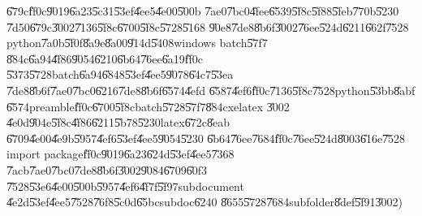 \begin{enumerate}
\U{679c}\U{ff0c}\U{9019}\U{6a23}\U{5c31}\U{53ef}\U{4ee5}\U{4e00}\U{500b}%
\U{7ae0}\U{7bc0}\U{4fee}\U{6539}\U{5f8c}\U{5f88}\U{5feb}\U{770b}\U{5230}%
\U{7d50}\U{679c}\U{3002}\U{7136}\U{5f8c}\U{6700}\U{5f8c}\U{5728}\U{5168}%
\U{90e8}\U{7de8}\U{8b6f}\U{3002}\U{76ee}\U{524d}\U{6211}\U{662f}\U{7528}%
python\U{7a0b}\U{5f0f}\U{8a9e}\U{8a00}\U{914d}\U{5408}windows batch\U{57f7}%
\U{884c}\U{6a94}\U{4f86}\U{9054}\U{6210}\U{6b64}\U{76ee}\U{6a19}\U{ff0c}%
\U{5373}\U{5728}batch\U{6a94}\U{6848}\U{53ef}\U{4ee5}\U{9078}\U{64c7}\U{53ea}%
\U{7de8}\U{8b6f}\U{7ae0}\U{7bc0}\U{6216}\U{7de8}\U{8b6f}\U{6574}\U{4efd}%
\U{6587}\U{4ef6}\U{ff0c}\U{7136}\U{5f8c}\U{7528}python\U{53bb}\U{8abf}%
\U{6574}preamble\U{ff0c}\U{6700}\U{5f8c}batch\U{5728}\U{57f7}\U{884c}xelatex%
\U{3002}\newline
\newline
\U{4e0d}\U{904e}\U{5f8c}\U{4f86}\U{6211}\U{5b78}\U{5230}latex\U{672c}\U{8eab}%
\U{6709}\U{4e00}\U{4e9b}\U{5957}\U{4ef6}\U{53ef}\U{4ee5}\U{9054}\U{5230}%
\U{6b64}\U{76ee}\U{7684}\U{ff0c}\U{76ee}\U{524d}\U{8003}\U{616e}\U{7528}%
import package\U{ff0c}\U{9019}\U{6a23}\U{624d}\U{53ef}\U{4ee5}\U{7368}%
\U{7acb}\U{7ae0}\U{7bc0}\U{7de8}\U{8b6f}\U{3002}\U{9084}\U{6709}\U{60f3}%
\U{7528}\U{53e6}\U{4e00}\U{500b}\U{5957}\U{4ef6}\U{4f7f}\U{5f97}subdocument%
\U{4e2d}\U{53ef}\U{4ee5}\U{7528}\U{76f8}\U{5c0d}\U{65bc}subdoc\U{6240}%
\U{8655}\U{5728}\U{7684}subfolder\U{8def}\U{5f91}\U{3002})


\end{enumerate}
